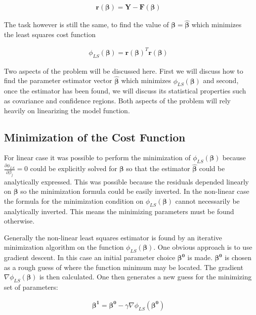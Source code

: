 \documentclass[12pt]{article}
\newcommand{\bv}[1]{\boldsymbol{#1}}
\begin{document}
\begin{align}
\bv{r}(\bv{\beta}) = \bv{Y} - \bv{F}(\bv{\beta})
\end{align}

The task however is still the same, to find the value of $\bv{\beta} = \bv{\hat{\beta}}$ which minimizes the least squares cost function

\begin{align}
\phi_{LS}(\bv{\beta}) = \bv{r}(\bv{\beta})^T\bv{r}(\bv{\beta})
\end{align}

Two aspects of the problem will be discussed here. 
First we will discuss how to find the parameter estimator vector $\bv{\hat{\beta}}$ which minimizes $\phi_{LS}(\bv{\beta})$ and second, once the estimator has been found, we will discuss its statistical properties such as covariance and confidence regions.
Both aspects of the problem will rely heavily on linearizing the model function.

\subsection{Minimization of the Cost Function}

For linear case it was possible to perform the minimization of $\phi_{LS}(\bv{\beta})$ because $\frac{\partial \phi_{LS}}{\partial \beta_j}=0$ could be explicitly solved for $\bv{\beta}$ so that the estimator $\bv{\hat{\beta}}$ could be analytically expressed. 
This was possible because the residuals depended linearly on $\bv{\beta}$ so the minimization formula could be easily inverted. 
In the non-linear case the formula for the minimization condition on $\phi_{LS}(\bv{\beta})$ cannot necessarily be analytically inverted. 
This means the minimizing parameters must be found otherwise.

Generally the non-linear least squares estimator is found by an iterative minimization algorithm on the function $\phi_{LS}(\bv{\beta})$. 
One obvious approach is to use gradient descent. 
In this case an initial parameter choice $\bv{\beta^0}$ is made.
$\bv{\beta^0}$ is chosen as a rough guess of where the function minimum may be located. 
The gradient $\nabla \phi_{LS}(\bv{\beta})$ is then calculated. 
One then generates a new guess for the minimizing set of parameters:

\begin{align}
\bv{\beta^1} = \bv{\beta^0} - \gamma \nabla \phi_{LS}(\bv{\beta^0})
\end{align}
\end{document}

